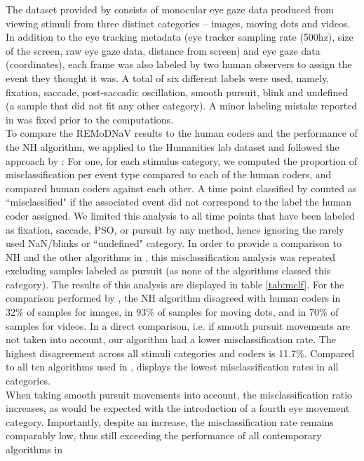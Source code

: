 The dataset provided by \cite{Andersson2017} consists of monocular eye gaze data produced from viewing stimuli from
three distinct categories -- images, moving dots and videos. In addition to the eye tracking metadata (eye tracker
sampling rate (500hz), size of the screen, raw eye gaze data, distance from screen) and eye gaze data (coordinates),
each frame was also labeled by two human observers to assign the event they thought it was. A total of six different
labels were used, namely, fixation, saccade, post-saccadic oscillation, smooth pursuit, blink and undefined (a sample
that did not fit any other category). A minor labeling mistake reported in \cite{Zemblys2018} was fixed prior to the
computations. \\
To compare the REMoDNaV results to the human coders and the performance of the NH algorithm, we applied \remodnav to
the Humanities lab dataset and followed the approach by \citet{Andersson2017}: For one, for each stimulus category,
we computed the proportion of misclassification per event type compared to each of the human coders, and compared
human coders against each other. A time point classified by \remodnav counted as ``misclassified" if the associated
event did not correspond to the label the human coder assigned. We limited this analysis to all time points that
have been labeled as fixation, saccade, PSO, or pursuit by any method, hence ignoring the rarely used NaN/blinks or
``undefined" category. In order to provide a comparison to NH and the other algorithms in \cite{Andersson2017}, this
misclassification analysis was repeated excluding samples labeled as pursuit (as none of the algorithms classed this
category). The results of this analysis are displayed in table \ref{tab:mclf}. For the comparison performed by
\citet{Andersson2017}, the NH algorithm disagreed with human coders in 32\% of samples for images, in 93\% of samples
for moving dots, and in 70\% of samples for videos. In a direct comparison, i.e. if smooth pursuit movements are
not taken into account, our algorithm had a lower misclassification rate. The highest disagreement across all stimuli
categories and coders is 11.7\%. Compared to all ten algorithms used in \citet{Andersson2017}, \remodnav displays
the lowest misclassification rates in all categories.\\
When taking smooth pursuit movements into account, the misclassification ratio increases, as would be expected
with the introduction of a fourth eye movement category. Importantly, despite an increase, the misclassification
rate remains comparably low, thus still exceeding the performance of all contemporary algorithms in
